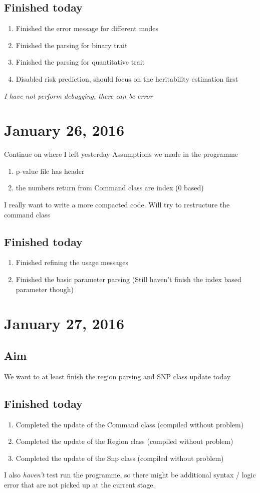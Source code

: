 \documentclass[12pt]{article}
\begin{document}
	\subsection{Finished today}
	\begin{enumerate}
		\item Finished the error message for different modes
		\item Finished the parsing for binary trait
		\item Finished the parsing for quantitative trait
		\item Disabled risk prediction, should focus on the heritability estimation first
	\end{enumerate}
	\emph{I have not perform debugging, there can be error}
	\section {January 26, 2016}
	Continue on where I left yesterday
	Assumptions we made in the programme
	\begin{enumerate}
		\item p-value file has header
		\item the numbers return from Command class are index (0 based)
	\end{enumerate}
	I really want to write a more compacted code.
	Will try to restructure the command class
	\subsection{Finished today}
	\begin{enumerate}
		\item Finished refining the usage messages
		\item Finished the basic parameter parsing (Still haven't finish the index based parameter though)
	\end{enumerate}
	\section{January 27, 2016}
	\subsection{Aim}
	We want to at least finish the region parsing and SNP class update today
	\subsection{Finished today}
	\begin{enumerate}
		\item Completed the update of the Command class (compiled without problem)
		\item Completed the update of the Region class (compiled without problem)
		\item Completed the update of the Snp class (compiled without problem)
	\end{enumerate}
	I also \emph{haven't} test run the programme, so there might be additional syntax / logic error that are not picked up at the current stage.
	
\end{document}
